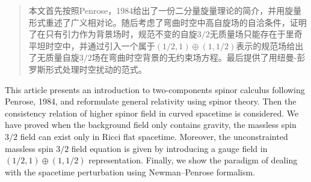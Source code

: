 \documentclass[oneside]{fduthesis}
\begin{document}
\frontmatter

\tableofcontents

\begin{abstract}
	本文首先按照Penrose，1984\parencite{penrose_spinors_1984}给出了一份二分量旋量理论的简介，并用旋量形式重述了广义相对论。随后考虑了弯曲时空中高自旋场的自洽条件，证明了在只有引力作为背景场时，规范不变的自旋$3/2$无质量场只能存在于里奇平坦时空中，并通过引入一个属于$(1/2,1)\oplus(1,1/2)$表示的规范场给出了无质量自旋$3/2$场在弯曲时空背景的无约束场方程。最后提供了用纽曼-彭罗斯形式处理时空扰动的范式。
\end{abstract}

\begin{abstract*}
	This article presents an introduction to two-components spinor calculus following Penrose, 1984\parencite{penrose_spinors_1984}, and reformulate general relativity using spinor theory. Then the consistency relation of higher spinor field in curved spacetime is considered. We have proved when the background field only contains gravity, the massless spin $3/2$ field can exist only in Ricci flat spacetime. Moreover, the unconstrainted massless spin $3/2$ field equation is given by introducing a gauge field in $(1/2,1)\oplus(1,1/2)$ representation. Finally, we show the paradigm of dealing with the spacetime perturbation using Newman–Penrose formalism. 
\end{abstract*}

\mainmatter


%   
%   
%   


















\end{document}
